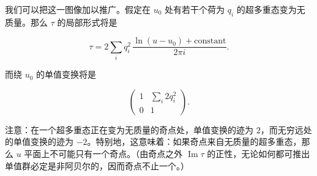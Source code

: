 

我们可以把这一图像加以推广。假定在 $u_0$ 处有若干个荷为 $q_i$ 的超多重态变为无质量。那么 $\tau$ 的局部形式将是

\[
  \tau=2\sum_i q_i^2\,\frac{\ln(u-u_0)+\text{constant}}{2\pi i}.
\]

而绕 $u_0$ 的单值变换将是

\[
  \begin{pmatrix}1&\sum_i2q_i^2\\0&1\end{pmatrix}.
\]

注意：在一个超多重态正在变为无质量的奇点处，单值变换的迹为 $2$，而无穷远处的单值变换的迹为 $-2$。特别地，这意味着：如果奇点来自无质量的超多重态，那么 $u$ 平面上不可能只有一个奇点。（由奇点之外 $\operatorname{Im}\tau$ 的正性，无论如何都可推出单值群必定是非阿贝尔的，因而奇点不止一个。）

